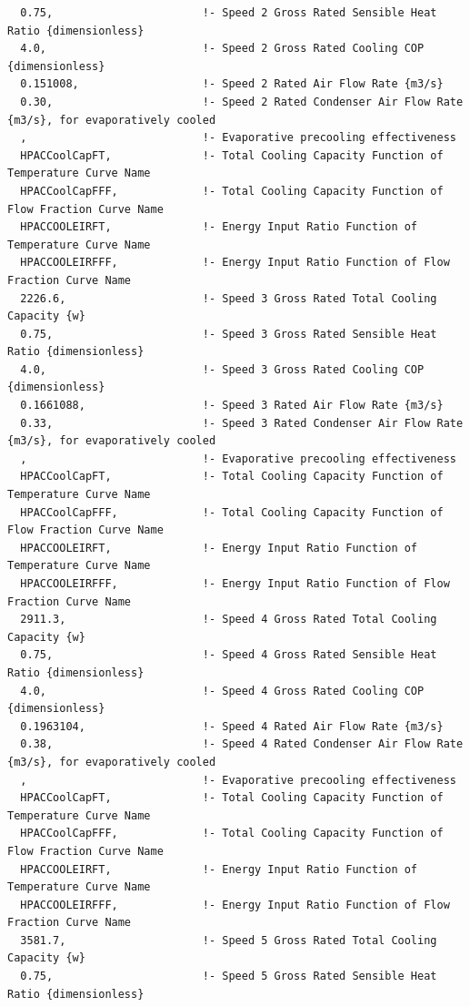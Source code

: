 \begin{lstlisting}
  0.75,                       !- Speed 2 Gross Rated Sensible Heat Ratio {dimensionless}
  4.0,                        !- Speed 2 Gross Rated Cooling COP {dimensionless}
  0.151008,                   !- Speed 2 Rated Air Flow Rate {m3/s}
  0.30,                       !- Speed 2 Rated Condenser Air Flow Rate {m3/s}, for evaporatively cooled
  ,                           !- Evaporative precooling effectiveness
  HPACCoolCapFT,              !- Total Cooling Capacity Function of Temperature Curve Name
  HPACCoolCapFFF,             !- Total Cooling Capacity Function of Flow Fraction Curve Name
  HPACCOOLEIRFT,              !- Energy Input Ratio Function of Temperature Curve Name
  HPACCOOLEIRFFF,             !- Energy Input Ratio Function of Flow Fraction Curve Name
  2226.6,                     !- Speed 3 Gross Rated Total Cooling Capacity {w}
  0.75,                       !- Speed 3 Gross Rated Sensible Heat Ratio {dimensionless}
  4.0,                        !- Speed 3 Gross Rated Cooling COP {dimensionless}
  0.1661088,                  !- Speed 3 Rated Air Flow Rate {m3/s}
  0.33,                       !- Speed 3 Rated Condenser Air Flow Rate {m3/s}, for evaporatively cooled
  ,                           !- Evaporative precooling effectiveness
  HPACCoolCapFT,              !- Total Cooling Capacity Function of Temperature Curve Name
  HPACCoolCapFFF,             !- Total Cooling Capacity Function of Flow Fraction Curve Name
  HPACCOOLEIRFT,              !- Energy Input Ratio Function of Temperature Curve Name
  HPACCOOLEIRFFF,             !- Energy Input Ratio Function of Flow Fraction Curve Name
  2911.3,                     !- Speed 4 Gross Rated Total Cooling Capacity {w}
  0.75,                       !- Speed 4 Gross Rated Sensible Heat Ratio {dimensionless}
  4.0,                        !- Speed 4 Gross Rated Cooling COP {dimensionless}
  0.1963104,                  !- Speed 4 Rated Air Flow Rate {m3/s}
  0.38,                       !- Speed 4 Rated Condenser Air Flow Rate {m3/s}, for evaporatively cooled
  ,                           !- Evaporative precooling effectiveness
  HPACCoolCapFT,              !- Total Cooling Capacity Function of Temperature Curve Name
  HPACCoolCapFFF,             !- Total Cooling Capacity Function of Flow Fraction Curve Name
  HPACCOOLEIRFT,              !- Energy Input Ratio Function of Temperature Curve Name
  HPACCOOLEIRFFF,             !- Energy Input Ratio Function of Flow Fraction Curve Name
  3581.7,                     !- Speed 5 Gross Rated Total Cooling Capacity {w}
  0.75,                       !- Speed 5 Gross Rated Sensible Heat Ratio {dimensionless}

\end{lstlisting}
